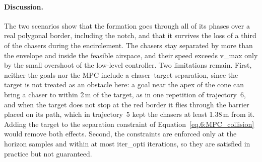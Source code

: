\paragraph{Discussion.}
The two scenarios show that the formation goes through all of its phases over a real polygonal border, including the notch, and that it survives the loss of a third of the chasers during the encirclement. The chasers stay separated by more than the envelope and inside the feasible airspace, and their speed exceeds \gls{v_max} only by the small overshoot of the low-level controller. Two limitations remain. First, neither the goals nor the \gls{MPC} include a chaser--target separation, since the target is not treated as an obstacle here: a goal near the apex of the cone can bring a chaser to within 2\,m of the target, as in one repetition of trajectory~6, and when the target does not stop at the red border it flies through the barrier placed on its path, which in trajectory~5 kept the chasers at least 1.38\,m from it. Adding the target to the separation constraint of Equation~\eqref{eq.6:MPC_collision} would remove both effects. Second, the constraints are enforced only at the horizon samples and within at most \gls{iter_opti} iterations, so they are satisfied in practice but not guaranteed.
